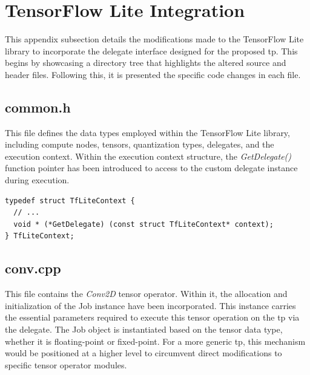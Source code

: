 \section{TensorFlow Lite Integration}
\label{chap:code_changes}
This appendix subsection details the modifications made to the TensorFlow Lite library to incorporate the delegate interface designed for the proposed \gls{tp}. This begins by showcasing a directory tree that highlights the altered source and header files. Following this, it is presented the specific code changes in each file.

\begin{figure}[!h]

\end{figure}
\FloatBarrier

\subsection*{common.h}

This file defines the data types employed within the TensorFlow Lite library, including compute nodes, tensors, quantization types, delegates, and the execution context. Within the execution context structure, the \textit{GetDelegate()} function pointer has been introduced to access to the custom delegate instance during execution.

\begin{lstlisting}
typedef struct TfLiteContext {
  // ...
  void * (*GetDelegate) (const struct TfLiteContext* context);
} TfLiteContext;
\end{lstlisting}

\subsection*{conv.cpp}
This file contains the \textit{Conv2D} tensor operator. Within it, the allocation and initialization of the Job instance have been incorporated. This instance carries the essential parameters required to execute this tensor operation on the \gls{tp} via the delegate. The Job object is instantiated based on the tensor data type, whether it is floating-point or fixed-point. For a more generic \gls{tp}, this mechanism would be positioned at a higher level to circumvent direct modifications to specific tensor operator modules.

